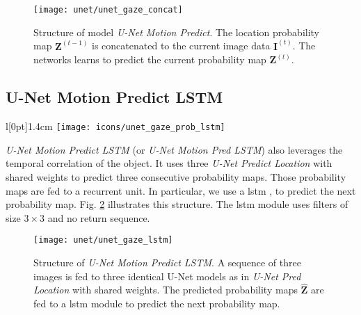 \begin{figure}[htbp]
  \centering
  \texttt{[image: unet/unet\_gaze\_concat]}
  \caption[U-Net Motion Predict]{Structure of model \textit{U-Net Motion Predict}.
    The location probability map $\boldsymbol{Z}^{(t-1)}$ is concatenated to the current image data $\boldsymbol{I}^{(t)}$.
    The networks learns to predict the current probability map $\boldsymbol{Z}^{(t)}$.}
  \label{fig:unet_gaze_concat}
\end{figure}


\subsection{U-Net Motion Predict LSTM} \label{ch:unet_gaze_prob_lstm}
\begingroup
\setlength\intextsep{0pt}
\begin{wrapfigure}[4]{l}[0pt]{1.4cm}
\texttt{[image: icons/unet\_gaze\_prob\_lstm]}
\end{wrapfigure}

\textit{U-Net Motion Predict LSTM} (or \textit{U-Net Motion Pred LSTM}) also leverages the temporal correlation of the object.
It uses three \textit{U-Net Predict Location} with shared weights to predict three consecutive probability maps.
Those probability maps are fed to a recurrent unit.
In particular, we use a \gls{lstm} \cite{shi15}, to predict the next probability map.
Fig. \ref{fig:unet_gaze_lstm} illustrates this structure.
The \gls{lstm} module uses filters of size $3 \times 3$ and no return sequence.

\endgroup

\begin{figure}[htbp]
  \centering
  \texttt{[image: unet/unet\_gaze\_lstm]}
  \caption[Structure of U-Net Motion Predict LSTM]{Structure of \textit{U-Net Motion Predict LSTM}.
    A sequence of three images is fed to three identical U-Net models as in \textit{U-Net Pred Location} with shared weights.
    The predicted probability maps $\boldsymbol{\hat{Z}}$ are fed to a \gls{lstm} module to predict the next probability map.}
  \label{fig:unet_gaze_lstm}
\end{figure}


